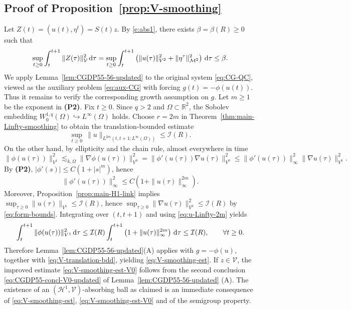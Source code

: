 \documentclass[12pt,leqno]{amsart}
\def\d{{\rm d}}
\def\R {\mathbb{R}}
\theoremstyle{definition}
\numberwithin{equation}{section}
\numberwithin{figure}{section}
\begin{document}
\subsection{Proof of Proposition~\ref{prop:V-smoothing}}
 
Let $Z(t)=(u(t),\eta^t)=S(t)z$. By \eqref{e:abs1}, there exists $\beta=\beta(R)\ge 0$ such that
\begin{equation}\label{eq:V-translation-bdd}
\sup_{t\ge 0}\int_t^{t+1}\|Z(\tau)\|_{\mathcal V}^2\,\d\tau
=\sup_{t\ge 0}\int_t^{t+1}\left(\|u(\tau)\|_{{V^2}}^2+\|\eta^\tau\|_{\mathcal M^2}^2\right)\,\d\tau
\le \beta.
\end{equation}
We apply Lemma~\ref{lem:CGDP55-56-updated} to the original system \eqref{eq:CG-QC}, viewed as the auxiliary problem
\eqref{eq:aux-CG} with forcing $g(t)=-\phi(u(t))$. 
Thus it remains to verify the corresponding growth assumption
on $g$.
Let $m\ge 1$ be the exponent in \textbf{(P2)}. Fix $t\ge 0$.
Since $q>2$ and $\Omega\subset\R^2$, the Sobolev embedding $W^{1,q}_0(\Omega)\hookrightarrow L^\infty(\Omega)$ holds.
Choose $r=2m$ in Theorem~\ref{thm:main-Linfty-smoothing}  to obtain the translation-bounded estimate
\begin{equation}\label{eq:u-Linfty-2m}
\sup_{t\ge 0}\ \|u\|_{L^{2m}(t,t+1;L^\infty(\Omega))} \le  \mathcal{I}(R).
\end{equation}
On the other hand, by ellipticity and the chain rule, almost everywhere in time
\[
\|\phi(u(\tau))\|_{{V^1}}^2
\lesssim_{k,\Omega} \|\nabla \phi(u(\tau))\|_{V^0}^2
=\|\phi'(u(\tau))\nabla u(\tau)\|_{V^0}^2
\le \|\phi'(u(\tau))\|_{\infty}^2\|\nabla u(\tau)\|_{V^0}^2.
\]
By \textbf{(P2)}, $|\phi'(s)|\le C(1+|s|^m)$, hence
\[
\|\phi'(u(\tau))\|_{\infty}^2 \le C\left(1+\|u(\tau)\|_{\infty}^{2m}\right).
\]
Moreover, Proposition~\ref{prop:main-H1-link} implies $\sup_{\tau\ge 0}\|u(\tau)\|_{{V^1}}\le \mathcal I(R)$, hence
$\sup_{\tau\ge 0}\|\nabla u(\tau)\|_{V^0}^2\le  \mathcal{I}(R)$ by \eqref{eq:form-bounds}.
Integrating over $(t,t+1)$ and using \eqref{eq:u-Linfty-2m} yields
\begin{equation}\label{eq:phi-H1-L2tb}
\int_t^{t+1}\|\phi(u(\tau))\|_{{V^1}}^2\,\d \tau
\le \mathcal{I}(R)\int_t^{t+1}\left(1+\|u(\tau)\|_{\infty}^{2m}\right)\,\d\tau
\le \mathcal{I}(R),
\qquad \forall t\ge 0.
\end{equation}
 Therefore Lemma~\ref{lem:CGDP55-56-updated}\textup{(A)} applies with $g=-\phi(u)$,
together with \eqref{eq:V-translation-bdd}, yielding \eqref{eq:V-smoothing-est}.
If $z\in\mathcal V$, the improved estimate \eqref{eq:V-smoothing-est-V0} follows from the second conclusion
\eqref{eq:CGDP55-concl-V0-updated} of Lemma~\ref{lem:CGDP55-56-updated} \textup{(A)}.
The existence of an $(\mathcal H^1,\mathcal V)$-absorbing ball as claimed
 is an immediate consequence of \eqref{eq:V-smoothing-est}, \eqref{eq:V-smoothing-est-V0} and of the semigroup property.
\end{document}
